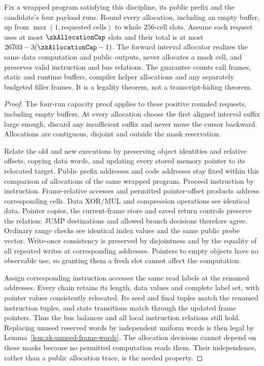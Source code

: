 \begin{proposition}\label{prop:zk-reserved-allocation}
Fix a wrapped program satisfying this discipline, its public prefix and the candidate's four payload runs. Round every allocation, including an empty buffer, up from $\max(1,\text{requested cells})$ to whole $256$-cell slots. Assume each request uses at most $\zkAllocationCap$ slots and their total is at most $26703-3(\zkAllocationCap-1)$. The forward interval allocator realizes the same data computation and public outputs, never allocates a mask cell, and preserves valid instruction and bus relations. The guarantee counts call frames, static and runtime buffers, compiler helper allocations and any separately budgeted filler frames. It is a legality theorem, not a transcript-hiding theorem.
\end{proposition}
\begin{proof}
The four-run capacity proof applies to these positive rounded requests, including empty buffers. At every allocation choose the first aligned interval suffix large enough, discard any insufficient suffix and never move the cursor backward. Allocations are contiguous, disjoint and outside the mask reservation.

Relate the old and new executions by preserving object identities and relative offsets, copying data words, and updating every stored memory pointer to its relocated target. Public prefix addresses and code addresses stay fixed within this comparison of allocations of the same wrapped program. Proceed instruction by instruction. Frame-relative accesses and permitted pointer-offset products address corresponding cells. Data XOR/MUL and compression operations see identical data. Pointer copies, the current-frame store and saved return controls preserve the relation; JUMP destinations and allowed branch decisions therefore agree. Ordinary range checks see identical index values and the same public probe vector. Write-once consistency is preserved by disjointness and by the equality of all repeated writes at corresponding addresses. Pointers to empty objects have no observable use, so granting them a fresh slot cannot affect the computation.

Assign corresponding instruction accesses the same read labels at the renamed addresses. Every chain retains its length, data values and complete label set, with pointer values consistently relocated. Its seed and final tuples match the renamed instruction tuples, and state transitions match through the updated frame pointers. Thus the bus balances and all local instruction relations still hold. Replacing unused reserved words by independent uniform words is then legal by Lemma~\ref{lem:zk-unused-frame-words}. The allocation decisions cannot depend on these masks because no permitted computation reads them. Their independence, rather than a public allocation trace, is the needed property.
\end{proof}

